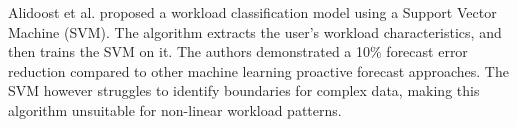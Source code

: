 Alidoost et al. \cite{alidoost2023introducing} proposed a workload classification model using a Support Vector Machine (SVM). The algorithm extracts the user's workload characteristics, and then trains the SVM on it. The authors demonstrated a 10\% forecast error reduction compared to other machine learning proactive forecast approaches. The SVM however struggles to identify boundaries for complex data, making this algorithm unsuitable for non-linear workload patterns.\par

